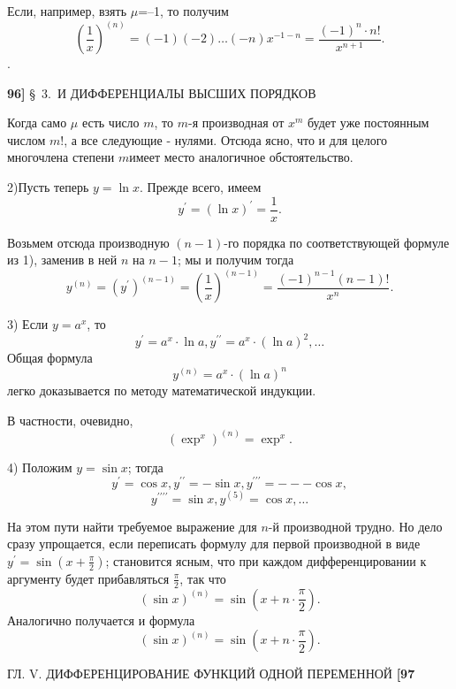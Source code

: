 \documentclass[a5paper]{book}
\begin{document}
Если, например, взять $\mu$=--1, то получим
$$
(\frac{1}{x})^(n)=(-1)(-2)\ldots(-n)x^{-1-n}=\dfrac{(-1)^n\cdot n!}{x^{n+1}}.
$$.

\newpage

	{\normalsize
 \noindent\textbf{96]}
 \hspace{15pt}
\scriptsize\centering \S \ 3.\  И ДИФФЕРЕНЦИАЛЫ ВЫСШИХ ПОРЯДКОВ}
 

\setlength{\parskip}{0.3cm}	
\smallskip	
Когда само $\mu$ есть  число $m$, то $m$-я производная от $x^{m}$ будет уже постоянным числом $m!$, а все следующие - нулями. Отсюда ясно, что и для целого многочлена степени $m$имеет место аналогичное обстоятельство.

2)Пусть теперь $y=\ln x$. Прежде всего, имеем
$$
y^\prime=(\ln x)^\prime=\dfrac{1}{x}.
$$

Возьмем отсюда производную $(n-1)$-го порядка по соответствующей формуле из 1), заменив в ней $n$ на $n-1$; мы и получим тогда
$$
y^{(n)}=(y^\prime)^{(n-1)}=(\frac{1}{x})^{(n-1)}=\dfrac{(-1)^{n-1}(n-1)!}{x^n}.
$$

3) Если $y=a^x$, то
$$
y^\prime=a^x\cdot\ln a, y^{\prime\prime}=a^x\cdot(\ln a)^2,\ldots
$$
\noindent Общая формула
$$
y^(n)=a^x\cdot(\ln a)^n
$$ 
\noindent легко доказывается по методу математической индукции.

В частности, очевидно,
$$
(\exp ^x)^{(n)}=\exp ^x.
$$ 

4) Положим $y=\sin x$; тогда
$$
y^\prime=\cos x,  y^{\prime\prime}= -\sin x,  y^{\prime\prime\prime}=---\cos x,
$$
$$
y^{\prime\prime\prime\prime}=\sin x,  y^{(5)}=\cos x,\ldots
$$

\noindent На этом пути найти требуемое  выражение для $n$-й производной трудно. Но дело сразу упрощается, если переписать формулу для первой производной в виде $y^{\prime}= \sin(x+\frac{\pi }{2})$; становится ясным, что при каждом дифференцировании к аргументу будет прибавляться $\frac{\pi }{2}$, так что
$$
(\sin x)^{(n)}=\sin (x+n\cdot\frac{\pi }{2}).
$$
\noindent Аналогично получается и формула
$$
(\sin x)^{(n)}=\sin (x+n\cdot\frac{\pi }{2}).
$$
\newpage

\begin{center}
\hspace{30pt}
{\scriptsize\centering\textsection ГЛ. V. ДИФФЕРЕНЦИРОВАНИЕ ФУНКЦИЙ ОДНОЙ ПЕРЕМЕННОЙ}
\hspace{15pt}
\textbf{[97}\\

\end{center}
\end{document}
